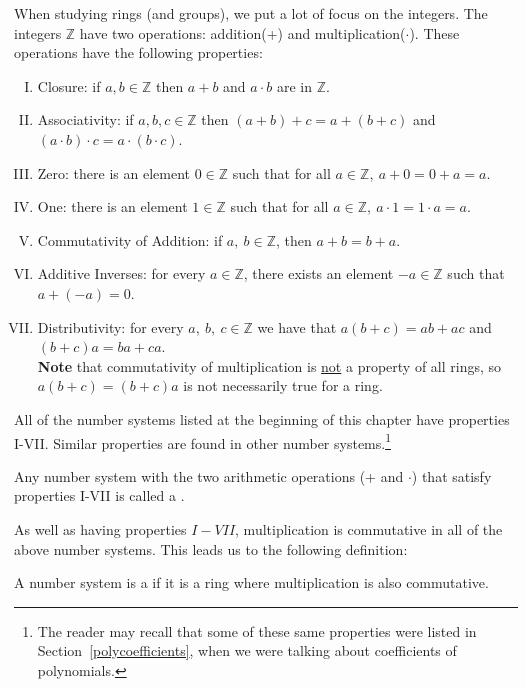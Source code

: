 When studying rings (and groups), we put a lot of focus on the integers.  The integers ${\mathbb Z}$ have two operations: addition(+) and multiplication($\cdot$). These operations have the following properties:
\begin{enumerate}[(I)]
\item Closure: if $a, b \in {\mathbb Z}$ then $a+b$ and $a\cdot b$ are in ${\mathbb Z}$.
\item Associativity: if $a, b, c\in {\mathbb Z}$ then $(a+b)+c=a+(b+c)$ and $(a\cdot b)\cdot c=a\cdot (b\cdot c)$.
\item Zero: there is an element $0\in {\mathbb Z}$ such that for all $a\in {\mathbb Z},~a+0=0+a=a$.
\item One: there is an element $1\in {\mathbb Z}$ such that for all $a\in {\mathbb Z},~a\cdot 1=1\cdot a=a$.
\item Commutativity of Addition: if $a,~b\in {\mathbb Z}$, then $a+b=b+a$. 
\item Additive Inverses: for every $a\in {\mathbb Z}$, there exists an element $-a\in {\mathbb Z}$ such that $a+(-a)=0$.
\item Distributivity: for every $a,~b,~c\in {\mathbb Z}$ we have that $a(b+c)=ab+ac$ and $(b+c)a=ba+ca$.\\

\textbf{Note} that commutativity of multiplication is \underline{not} a property of all  rings, so $a(b+c)=(b+c)a$ is not necessarily true for a ring.
 \end{enumerate}

All of the number systems listed at the beginning of this chapter have properties I-VII.  Similar properties are found in other number systems.\footnote{The reader may recall that some of these same properties were listed in Section~\ref{polycoefficients}, when we were talking about coefficients of polynomials.}

\begin{defn}\label{def:ring}
Any number system with the two arithmetic operations (+ and $\cdot$) that satisfy properties I-VII is called a .
\end{defn}

As well as having properties $I-VII$, multiplication is commutative in all of the above number systems. This leads us to the following definition:

\begin{defn}\label{def:comring}
A number system is a  if it is a ring where multiplication is also commutative.
\end{defn}

